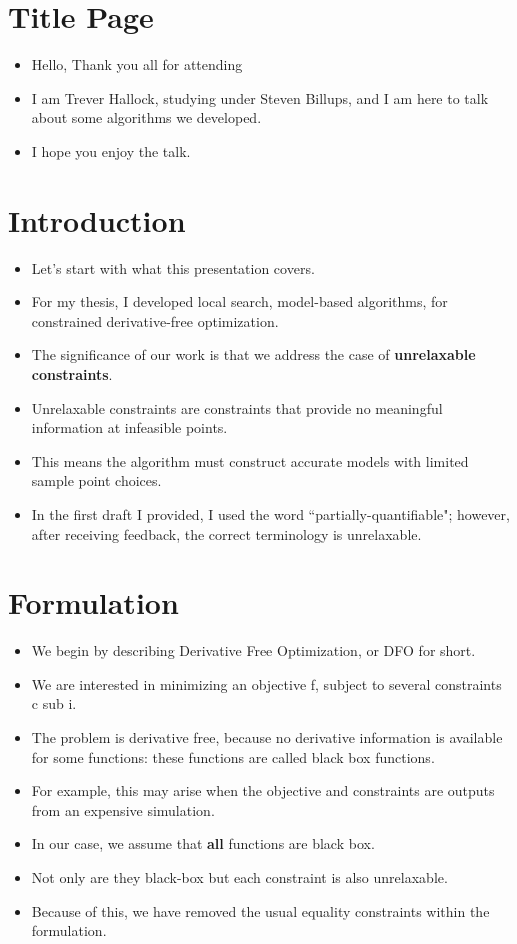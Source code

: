 \documentclass{article}
\begin{document}
\large

	\section{Title Page}
\begin{itemize}
\item Hello, Thank you all for attending
\item I am Trever Hallock, studying under Steven Billups, and I am here to talk about some algorithms we developed.
\item I hope you enjoy the talk.
\end{itemize}


	\section{Introduction}
\begin{itemize}
\item Let's start with what this presentation covers.
\item For my thesis, I developed local search, model-based algorithms, for constrained derivative-free optimization.
\item The significance of our work is that we address the case of \textbf{unrelaxable constraints}.
\item Unrelaxable constraints are constraints that provide no meaningful information at infeasible points.
\item This means the algorithm must construct accurate models with limited sample point choices.
\item In the first draft I provided, I used the word ``partially-quantifiable"; however, after receiving feedback, the correct terminology is unrelaxable.
\end{itemize}

	\section{Formulation}
\begin{itemize}
\item We begin by describing Derivative Free Optimization, or DFO for short.
\item We are interested in minimizing an objective f, subject to several constraints c sub i.
\item The problem is derivative free, because no derivative information is available for some functions: these functions are called black box functions.
\item For example, this may arise when the objective and constraints are outputs from an expensive simulation.
\item In our case, we assume that \textbf{all} functions are black box.
\item Not only are they black-box but each constraint is also unrelaxable.
\item Because of this, we have removed the usual equality constraints within the formulation.
\end{itemize}
\end{document}
